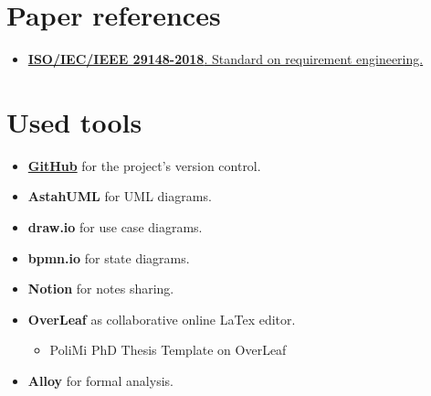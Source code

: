 \section{Paper references}
\label{sec:paper_references}%
\begin{itemize}
    \item \href{https://ieeexplore.ieee.org/document/8559686}{\textbf{ISO/IEC/IEEE 29148-2018}. Standard on requirement engineering.}
\end{itemize}


\section{Used tools}
\label{sec:used_tools}%
\begin{itemize}
    \item \href{https://github.com/MattiaBelfiore/BelfioreBenedettiBuccheri}{\textbf{GitHub}} for the project's version control.
    \item \textbf{AstahUML} for UML diagrams.
    \item \textbf{draw.io} for use case diagrams.
    \item \textbf{bpmn.io} for state diagrams.
    \item \textbf{Notion} for notes sharing.
    \item \textbf{OverLeaf} as collaborative online LaTex editor.
    \begin{itemize}
        \item PoliMi PhD Thesis Template on OverLeaf
    \end{itemize}
    \item \textbf{Alloy} for formal analysis.
\end{itemize}
